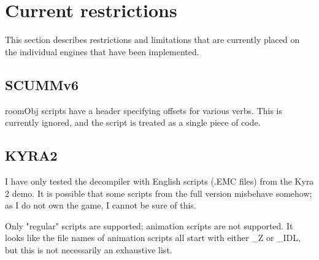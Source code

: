 \section{Current restrictions}
This section describes restrictions and limitations that are currently placed on the individual engines that have been implemented.

\subsection{SCUMMv6}
roomObj scripts have a header specifying offsets for various verbs. This is currently ignored, and the script is treated as a single piece of code.

\subsection{KYRA2}
I have only tested the decompiler with English scripts (.EMC files) from the Kyra 2 demo. It is possible that some scripts from the full version misbehave somehow; as I do not own the game, I cannot be sure of this.

Only "regular" scripts are supported; animation scripts are not supported. It looks like the file names of animation scripts all start with either \_Z or \_IDL, but this is not necessarily an exhaustive list.
